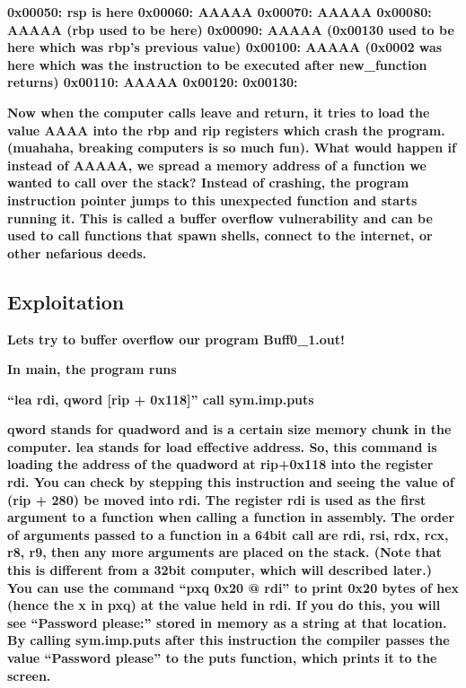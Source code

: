 \documentclass[letterpaper]{article}
\begin{document}
\textbf{0x00050: rsp is here\newline
0x00060: AAAAA\newline
0x00070: AAAAA\newline
0x00080: AAAAA (rbp used to be here)\newline
0x00090: AAAAA (0x00130 used to be here which was rbp's previous value)\newline
0x00100: AAAAA (0x0002 was here which was the instruction to be executed after new\_function returns)\newline
0x00110: AAAAA\newline
0x00120:\newline
0x00130:}

\textbf{Now when the computer calls leave and return, it tries to load the value AAAA into the rbp and rip registers
which crash the program. (muahaha, breaking computers is so much fun). What would happen if instead of AAAAA, we spread
a memory address of a function we wanted to call over the stack? Instead of crashing, the program instruction pointer
jumps to this unexpected function and starts running it. This is called a buffer overflow vulnerability and can be used
to call functions that spawn shells, connect to the internet, or other nefarious deeds.}

\subsection{Exploitation}

\textbf{Lets try to buffer overflow our program Buff0\_1.out!}

\textbf{In main, the program runs}

\textbf{{}``lea rdi, qword [rip + 0x118]''\newline
call sym.imp.puts}

\textbf{qword stands for quadword and is a certain size memory chunk in the computer. lea stands for load effective
address. So, this command is loading the address of the quadword at rip+0x118 into the register rdi. You can check by
stepping this instruction and seeing the value of (rip + 280) be moved into rdi. The register rdi is used as the first
argument to a function when calling a function in assembly. The order of arguments passed to a function in a 64bit call
are rdi, rsi, rdx, rcx, r8, r9, then any more arguments are placed on the stack. (Note that this is different from a
32bit computer, which will described later.) You can use the command ``pxq 0x20 @ rdi'' to print 0x20 bytes of hex
(hence the x in pxq) at the value held in rdi. If you do this, you will see ``Password please:'' stored in memory as a
string at that location. By calling sym.imp.puts after this instruction the compiler passes the value ``Password
please'' to the puts function, which prints it to the screen.}
\end{document}
